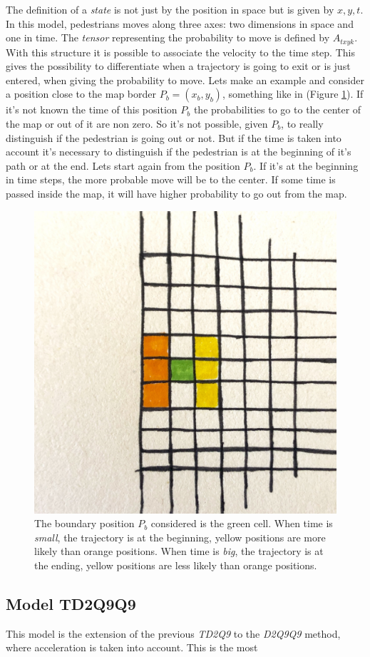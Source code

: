 \documentclass[class=article, crop=false]{standalone}
\begin{document}
The definition of a \emph{state} is not just by the position in space but is given by $x, y, t$.
In this model, pedestrians moves along three axes: two dimensions in space and one in time.
The \emph{tensor} representing the probability to move is defined by $A_{t x y k}$.
With this structure it is possible to associate the velocity to the time step.
This gives the possibility to differentiate when a trajectory is going to exit or is just entered, when giving the probability to move.
Lets make an example and consider a position close to the map border $P_b = (x_b, y_b)$, something like in (Figure \ref{fig:boundary_position}).
If it's not known the time of this position $P_b$ the probabilities to go to the center of the map or out of it are non zero.
So it's not possible, given $P_b$, to really distinguish if the pedestrian is going out or not.
But if the time is taken into account it's necessary to distinguish if the pedestrian is at the beginning of it's path or at the end.
Lets start again from the position $P_b$.
If it's at the beginning in time steps, the more probable move will be to the center.
If some time is passed inside the map, it will have higher probability to go out from the map.

\begin{figure}[h]
\centering
\includegraphics[scale=0.1]{draw/Boundary_position_in_out}
\captionsetup{width=.6\linewidth}
\caption{The boundary position $P_b$ considered is the green cell.
When time is \emph{small}, the trajectory is at the beginning, yellow positions are more likely than orange positions.
When time is \emph{big}, the trajectory is at the ending, yellow positions are less likely than orange positions.}
\label{fig:boundary_position}
\end{figure}


\subsection{Model TD2Q9Q9}
This model is the extension of the previous \emph{TD2Q9} to the \emph{D2Q9Q9} method, where acceleration is taken into account.
This is the most 
\end{document}
